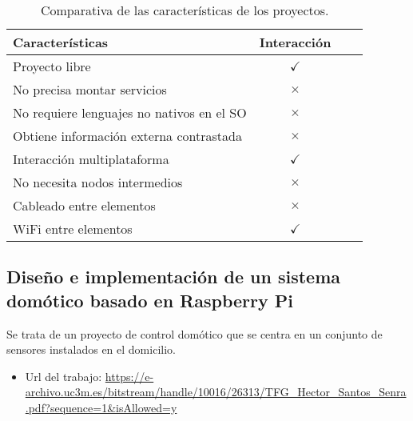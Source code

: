 \begin{table}
\centering
\begin{tabular}{lccc}
\toprule
Características & Interacción  \\
\midrule
Proyecto libre                          & \cellcolor{green!25} {$\checkmark$}\\
No precisa montar servicios             &  \cellcolor{red!25} {$\times$}  \\
No requiere lenguajes no nativos en el SO & \cellcolor{red!25} {$\times$} \\
Obtiene información externa contrastada & \cellcolor{red!25} {$\times$} \\
Interacción multiplataforma             & \cellcolor{green!25} {$\checkmark$} \\
No necesita nodos intermedios           & \cellcolor{red!25} {$\times$} \\
Cableado entre elementos                & \cellcolor{red!25} {$\times$} \\
WiFi entre elementos                    & \cellcolor{green!25} {$\checkmark$} \\
\bottomrule
\end{tabular}
\caption{Comparativa de las características de los proyectos.}
\label{tabla_Interacción}
\end{table}

\subsection{Diseño e implementación de un sistema domótico basado en Raspberry Pi}
Se trata de un proyecto de control domótico que se centra en un conjunto de sensores instalados en el domicilio.

\begin{itemize}
    \item Url del trabajo: \url{https://e-archivo.uc3m.es/bitstream/handle/10016/26313/TFG_Hector_Santos_Senra.pdf?sequence=1&isAllowed=y}
\end{itemize}

